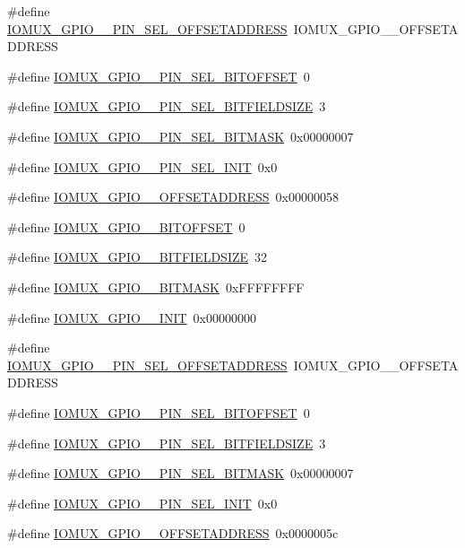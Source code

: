 \begin{DoxyCompactItemize}
\item 
\#define \hyperlink{a00560_a8ca1ccfbd722127f166c9efeed808203}{IOMUX\_\-GPIO\_\_\-PIN\_\-SEL\_\-OFFSETADDRESS}~IOMUX\_\-GPIO\_\_\-OFFSETADDRESS
\item 
\#define \hyperlink{a00560_a1fba95e8d4143df3685cb402f7de6dc3}{IOMUX\_\-GPIO\_\_\-PIN\_\-SEL\_\-BITOFFSET}~0
\item 
\#define \hyperlink{a00560_a2fdba63c967662f4a2550d6424410a04}{IOMUX\_\-GPIO\_\_\-PIN\_\-SEL\_\-BITFIELDSIZE}~3
\item 
\#define \hyperlink{a00560_aeafd7ad0f209c6a5cdbcba54e101db5f}{IOMUX\_\-GPIO\_\_\-PIN\_\-SEL\_\-BITMASK}~0x00000007
\item 
\#define \hyperlink{a00560_a6bb0b17a7f4cf00ec52d5df342abcadd}{IOMUX\_\-GPIO\_\_\-PIN\_\-SEL\_\-INIT}~0x0
\item 
\#define \hyperlink{a00560_a0d604f9b543e98a51d7d944be71173a7}{IOMUX\_\-GPIO\_\_\-OFFSETADDRESS}~0x00000058
\item 
\#define \hyperlink{a00560_a63353efaf70816e40e60748f28b32f82}{IOMUX\_\-GPIO\_\_\-BITOFFSET}~0
\item 
\#define \hyperlink{a00560_a5a8d5c56b26425aa5f2c361bc972c028}{IOMUX\_\-GPIO\_\_\-BITFIELDSIZE}~32
\item 
\#define \hyperlink{a00560_aba88fbd6b369c0217c454ec419166708}{IOMUX\_\-GPIO\_\_\-BITMASK}~0xFFFFFFFF
\item 
\#define \hyperlink{a00560_aa92792d3644b7b321d363ab75ac22e36}{IOMUX\_\-GPIO\_\_\-INIT}~0x00000000
\item 
\#define \hyperlink{a00560_aaa3952e9ca5e1ff0ee467047d9ff001e}{IOMUX\_\-GPIO\_\_\-PIN\_\-SEL\_\-OFFSETADDRESS}~IOMUX\_\-GPIO\_\_\-OFFSETADDRESS
\item 
\#define \hyperlink{a00560_ab6fe93ae8a21532da79df51061af1e9e}{IOMUX\_\-GPIO\_\_\-PIN\_\-SEL\_\-BITOFFSET}~0
\item 
\#define \hyperlink{a00560_ad7bea23b59f648c209c6b61369ff3c69}{IOMUX\_\-GPIO\_\_\-PIN\_\-SEL\_\-BITFIELDSIZE}~3
\item 
\#define \hyperlink{a00560_abe4e59f594760f13be152e11a61e1e77}{IOMUX\_\-GPIO\_\_\-PIN\_\-SEL\_\-BITMASK}~0x00000007
\item 
\#define \hyperlink{a00560_a17b06525e16bc119da7d9b9b0e57834c}{IOMUX\_\-GPIO\_\_\-PIN\_\-SEL\_\-INIT}~0x0
\item 
\#define \hyperlink{a00560_a35a0eddceafb722740d872d3871c2bbc}{IOMUX\_\-GPIO\_\_\-OFFSETADDRESS}~0x0000005c
\item 

\end{DoxyCompactItemize}
